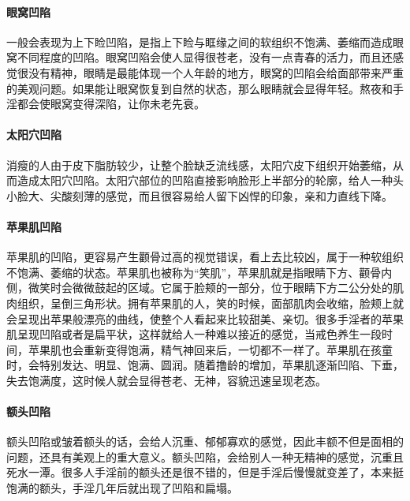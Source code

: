 \paragraph{眼窝凹陷} 一般会表现为上下睑凹陷，是指上下睑与眶缘之间的软组织不饱满、萎缩而造成眼窝不同程度的凹陷。眼窝凹陷会使人显得很苍老，没有一点青春的活力，而且还感觉很没有精神，眼睛是最能体现一个人年龄的地方，眼窝的凹陷会给面部带来严重的美观问题。如果能让眼窝恢复到自然的状态，那么眼睛就会显得年轻。熬夜和手淫都会使眼窝变得深陷，让你未老先衰。

\paragraph{太阳穴凹陷} 消瘦的人由于皮下脂肪较少，让整个脸缺乏流线感，太阳穴皮下组织开始萎缩，从而造成太阳穴凹陷。太阳穴部位的凹陷直接影响脸形上半部分的轮廓，给人一种头小脸大、尖酸刻薄的感觉，而且很容易给人留下凶悍的印象，亲和力直线下降。

\paragraph{苹果肌凹陷} 苹果肌的凹陷，更容易产生颧骨过高的视觉错误，看上去比较凶，属于一种软组织不饱满、萎缩的状态。苹果肌也被称为“笑肌”，苹果肌就是指眼睛下方、颧骨内侧，微笑时会微微鼓起的区域。它属于脸颊的一部分，位于眼睛下方二公分处的肌肉组织，呈倒三角形状。拥有苹果肌的人，笑的时候，面部肌肉会收缩，脸颊上就会呈现出苹果般漂亮的曲线，使整个人看起来比较甜美、亲切。很多手淫者的苹果肌呈现凹陷或者是扁平状，这样就给人一种难以接近的感觉，当戒色养生一段时间，苹果肌也会重新变得饱满，精气神回来后，一切都不一样了。苹果肌在孩童时，会特别发达、明显、饱满、圆润。随着撸龄的增加，苹果肌逐渐凹陷、下垂，失去饱满度，这时候人就会显得苍老、无神，容貌迅速呈现老态。

\paragraph{额头凹陷} 额头凹陷或皱着额头的话，会给人沉重、郁郁寡欢的感觉，因此丰额不但是面相的问题，还具有美观上的重大意义。额头凹陷，会给别人一种无精神的感觉，沉重且死水一潭。很多人手淫前的额头还是很不错的，但是手淫后慢慢就变差了，本来挺饱满的额头，手淫几年后就出现了凹陷和扁塌。

